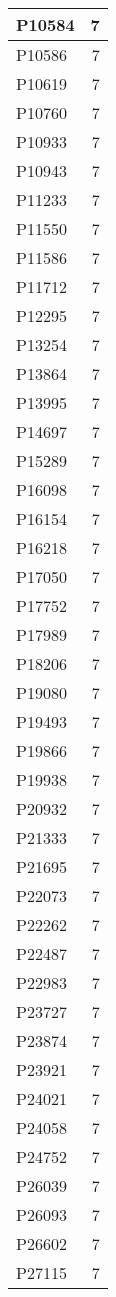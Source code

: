 \documentclass[
]{book}
\theoremstyle{definition}
\theoremstyle{definition}
\theoremstyle{definition}
\theoremstyle{definition}
\theoremstyle{remark}
\begin{document}
\begin{table}
\begin{tabular}{l|r}
\hline
P10584 & 7\\
\hline
P10586 & 7\\
\hline
P10619 & 7\\
\hline
P10760 & 7\\
\hline
P10933 & 7\\
\hline
P10943 & 7\\
\hline
P11233 & 7\\
\hline
P11550 & 7\\
\hline
P11586 & 7\\
\hline
P11712 & 7\\
\hline
P12295 & 7\\
\hline
P13254 & 7\\
\hline
P13864 & 7\\
\hline
P13995 & 7\\
\hline
P14697 & 7\\
\hline
P15289 & 7\\
\hline
P16098 & 7\\
\hline
P16154 & 7\\
\hline
P16218 & 7\\
\hline
P17050 & 7\\
\hline
P17752 & 7\\
\hline
P17989 & 7\\
\hline
P18206 & 7\\
\hline
P19080 & 7\\
\hline
P19493 & 7\\
\hline
P19866 & 7\\
\hline
P19938 & 7\\
\hline
P20932 & 7\\
\hline
P21333 & 7\\
\hline
P21695 & 7\\
\hline
P22073 & 7\\
\hline
P22262 & 7\\
\hline
P22487 & 7\\
\hline
P22983 & 7\\
\hline
P23727 & 7\\
\hline
P23874 & 7\\
\hline
P23921 & 7\\
\hline
P24021 & 7\\
\hline
P24058 & 7\\
\hline
P24752 & 7\\
\hline
P26039 & 7\\
\hline
P26093 & 7\\
\hline
P26602 & 7\\
\hline
P27115 & 7\\

\end{tabular}
\end{table}
\end{document}
